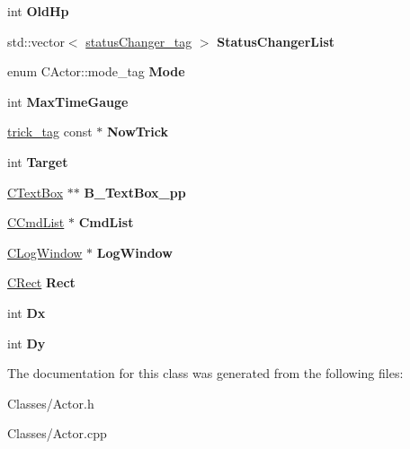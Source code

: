 \begin{DoxyCompactItemize}
\item 
int {\bfseries Old\+Hp}\hypertarget{class_c_actor_a803b716cfe5e1a59911d527059e53d6e}{}\label{class_c_actor_a803b716cfe5e1a59911d527059e53d6e}

\item 
std\+::vector$<$ \hyperlink{structstatus_changer__tag}{status\+Changer\+\_\+tag} $>$ {\bfseries Status\+Changer\+List}\hypertarget{class_c_actor_a87bfed34f5f22e66cfc494a5d520133f}{}\label{class_c_actor_a87bfed34f5f22e66cfc494a5d520133f}

\item 
enum C\+Actor\+::mode\+\_\+tag {\bfseries Mode}\hypertarget{class_c_actor_ab2bfcc416a6879d7c69e980d77c7ebb8}{}\label{class_c_actor_ab2bfcc416a6879d7c69e980d77c7ebb8}

\item 
int {\bfseries Max\+Time\+Gauge}\hypertarget{class_c_actor_a86bc225671cd386221901b28d33804cc}{}\label{class_c_actor_a86bc225671cd386221901b28d33804cc}

\item 
\hyperlink{structtrick__tag}{trick\+\_\+tag} const $\ast$ {\bfseries Now\+Trick}\hypertarget{class_c_actor_ae398d65941b26ef5ae11f718c9117873}{}\label{class_c_actor_ae398d65941b26ef5ae11f718c9117873}

\item 
int {\bfseries Target}\hypertarget{class_c_actor_acf74fa1cd5a89bfb32599bb2d0927b84}{}\label{class_c_actor_acf74fa1cd5a89bfb32599bb2d0927b84}

\item 
\hyperlink{class_c_text_box}{C\+Text\+Box} $\ast$$\ast$ {\bfseries B\+\_\+\+Text\+Box\+\_\+pp}\hypertarget{class_c_actor_a7d30e5ece501e58905ca84190a6eca0c}{}\label{class_c_actor_a7d30e5ece501e58905ca84190a6eca0c}

\item 
\hyperlink{class_c_cmd_list}{C\+Cmd\+List} $\ast$ {\bfseries Cmd\+List}\hypertarget{class_c_actor_ad2178344644dfb6641d22270347a2642}{}\label{class_c_actor_ad2178344644dfb6641d22270347a2642}

\item 
\hyperlink{class_c_log_window}{C\+Log\+Window} $\ast$ {\bfseries Log\+Window}\hypertarget{class_c_actor_ac9d927740f7bd27888810f01b7adfbb8}{}\label{class_c_actor_ac9d927740f7bd27888810f01b7adfbb8}

\item 
\hyperlink{class_c_rect}{C\+Rect} {\bfseries Rect}\hypertarget{class_c_actor_a2966bbb88f033f4a22432e3337779665}{}\label{class_c_actor_a2966bbb88f033f4a22432e3337779665}

\item 
int {\bfseries Dx}\hypertarget{class_c_actor_ad92a8c0de5571aa8b22cd3feb9c481e3}{}\label{class_c_actor_ad92a8c0de5571aa8b22cd3feb9c481e3}

\item 
int {\bfseries Dy}\hypertarget{class_c_actor_ae3c51fdf009247a37a4ab868fa17a324}{}\label{class_c_actor_ae3c51fdf009247a37a4ab868fa17a324}

\end{DoxyCompactItemize}


The documentation for this class was generated from the following files\+:\begin{DoxyCompactItemize}
\item 
Classes/Actor.\+h\item 
Classes/Actor.\+cpp\end{DoxyCompactItemize}
